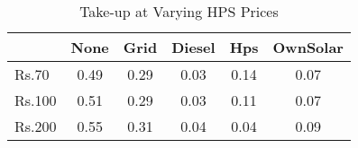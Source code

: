 \begin{table}[htbp]\centering
\caption{Take-up at Varying HPS Prices\label {tab1}}
\begin{tabular}{l*{5}{c}}
\toprule
            &        None&        Grid&      Diesel&         Hps&    OwnSolar\\
\midrule
Rs.70       &        0.49&        0.29&        0.03&        0.14&        0.07\\
Rs.100      &        0.51&        0.29&        0.03&        0.11&        0.07\\
Rs.200      &        0.55&        0.31&        0.04&        0.04&        0.09\\
\bottomrule
\end{tabular}
\end{table}
